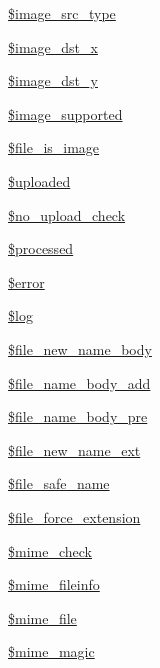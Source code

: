 \begin{DoxyCompactItemize}
\item 
\hyperlink{classupload_abd2ece07b754d86b28077d5f8122c3c1}{\$image\+\_\+src\+\_\+type}
\item 
\hyperlink{classupload_a44eb8389fea424cc9c99d62db2f867ad}{\$image\+\_\+dst\+\_\+x}
\item 
\hyperlink{classupload_af75ecad87cc20494e3a7e63f6550a5a8}{\$image\+\_\+dst\+\_\+y}
\item 
\hyperlink{classupload_ad6bc5d872ae4149b44ed2f61cf9c965a}{\$image\+\_\+supported}
\item 
\hyperlink{classupload_a95b7819bba3f29bb310371e189ee1edf}{\$file\+\_\+is\+\_\+image}
\item 
\hyperlink{classupload_a5e92bb37ab892f2f238ed28c5c2c40d2}{\$uploaded}
\item 
\hyperlink{classupload_a7f1d156af970c8c6f915edc136b2824d}{\$no\+\_\+upload\+\_\+check}
\item 
\hyperlink{classupload_aac44a4d5065e07e9a7a51ce8ef4a5c71}{\$processed}
\item 
\hyperlink{classupload_aeba2ab722cedda53dbb7ec1a59f45550}{\$error}
\item 
\hyperlink{classupload_a9a2cf15a653aee8be437f7ae474cd494}{\$log}
\item 
\hyperlink{classupload_a1d2468e864be6db15e49fa330ee3dad4}{\$file\+\_\+new\+\_\+name\+\_\+body}
\item 
\hyperlink{classupload_a8b2e6afa27ee4c7c7b48f38e8a80f811}{\$file\+\_\+name\+\_\+body\+\_\+add}
\item 
\hyperlink{classupload_af58f1dcbb2c7572db7611413e73151e5}{\$file\+\_\+name\+\_\+body\+\_\+pre}
\item 
\hyperlink{classupload_adc2e395ea621ff983c3b67a062555a10}{\$file\+\_\+new\+\_\+name\+\_\+ext}
\item 
\hyperlink{classupload_a82a23ba65833522ea1bf621d53efa11a}{\$file\+\_\+safe\+\_\+name}
\item 
\hyperlink{classupload_a73c6ea0ea29c6623b213fa6de52a8629}{\$file\+\_\+force\+\_\+extension}
\item 
\hyperlink{classupload_ab1e37b2a9ffcf921621e1c7221e2e932}{\$mime\+\_\+check}
\item 
\hyperlink{classupload_afaed2efd9e2bb03fd407ab32be2e05d7}{\$mime\+\_\+fileinfo}
\item 
\hyperlink{classupload_acbf8c9bd45238ac9f20ded6b79abc6fa}{\$mime\+\_\+file}
\item 
\hyperlink{classupload_a7aff0d9c568dbeb29749b0ed0d808f4d}{\$mime\+\_\+magic}
\item 

\end{DoxyCompactItemize}
